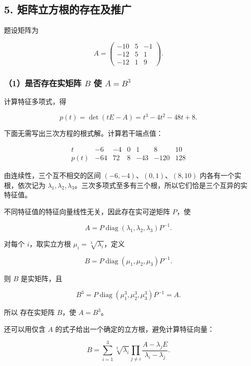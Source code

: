 \documentclass[11pt,fontset=fandol]{ctexart}
\begin{document}
\subsection{5.
矩阵立方根的存在及推广}\label{ux77e9ux9635ux7acbux65b9ux6839ux7684ux5b58ux5728ux53caux63a8ux5e7f}

题设矩阵为

\[
A=\begin{pmatrix}
-10&5&-1\\
-12&5&1\\
-12&1&9
\end{pmatrix}.
\]

\subsubsection{\texorpdfstring{（1）是否存在实矩阵 \(B\) 使
\(A=B^3\)}{（1）是否存在实矩阵 B 使 A=B\^{}3}}\label{ux662fux5426ux5b58ux5728ux5b9eux77e9ux9635-b-ux4f7f-ab3}

计算特征多项式，得

\[
p(t)=\det(tE-A)=t^3-4t^2-48t+8.
\]

下面无需写出三次方程的根式解。计算若干端点值：

\[
\begin{array}{c|rrrrrr}
t&-6&-4&0&1&8&10\\\hline
p(t)&-64&72&8&-43&-120&128
\end{array}
\]

由连续性，三个互不相交的区间 \((-6,-4)\)、\((0,1)\)、\((8,10)\)
内各有一个实根，依次记为
\(\lambda_1,\lambda_2,\lambda_3\)。三次多项式至多有三个根，所以它们恰是三个互异的实特征值。

不同特征值的特征向量线性无关，因此存在实可逆矩阵 \(P\)，使

\[
A=P\operatorname{diag}(\lambda_1,\lambda_2,\lambda_3)P^{-1}.
\]

对每个 \(i\)，取实立方根 \(\mu_i=\sqrt[3]{\lambda_i}\)，定义

\[
B=P\operatorname{diag}(\mu_1,\mu_2,\mu_3)P^{-1}.
\]

则 \(B\) 是实矩阵，且

\[
B^3=P\operatorname{diag}(\mu_1^3,\mu_2^3,\mu_3^3)P^{-1}=A.
\]

所以 \(\boxed{\text{存在实矩阵 }B\text{，使 }A=B^3}\)。

还可以用仅含 \(A\) 的式子给出一个确定的立方根，避免计算特征向量：

\[
B=\sum_{i=1}^3\sqrt[3]{\lambda_i}
\prod_{j\ne i}\frac{A-\lambda_jE}{\lambda_i-\lambda_j}.
\]
\end{document}
